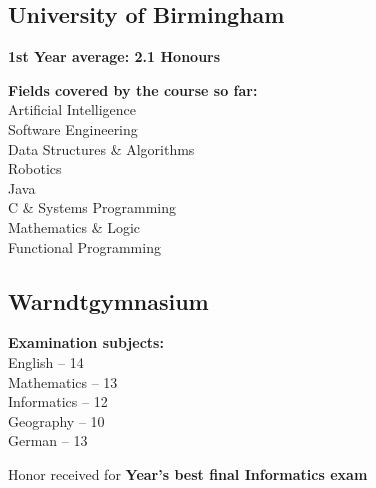\documentclass[]{jonas-cv}
\begin{document}
\begin{minipage}[t]{0.34\textwidth} 


\tinysectionsep
\vspace{0.25mm}
\subsection{University of Birmingham}
\sectionsep

\begin{tightemize}
    \item \textbf{1st Year average: 2.1 Honours}
    \item \textbf{Fields covered by the course so far:}\\
    Artificial Intelligence \\
    Software Engineering \\
    Data Structures \& Algorithms \\
    Robotics \\
    Java \\
    C \& Systems Programming \\
    Mathematics \& Logic \\
    Functional Programming
\end{tightemize}
\largesectionsep


\subsection{Warndtgymnasium}

\begin{tightemize}
    \item \textbf{Examination subjects:}\\
             English -- 14 \\
             Mathematics -- 13\\
             Informatics -- 12\\
             Geography -- 10\\
             German -- 13
    \item Honor received for \textbf{Year's best final Informatics exam}
\end{tightemize}
\largesectionsep
\vspace{4mm}


\end{minipage}
\end{document}
